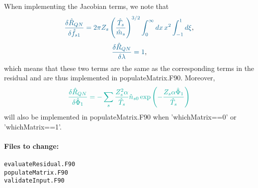 \documentclass[12pt]{article}
\begin{document}
\noindent When implementing the Jacobian terms, we note that 
\begin{equation}
  \label{eq:QNJacobianf1}
\textcolor{MidnightBlue}{
  \frac{\delta \hat{R}_{QN}}{\delta \hat{f}_{s 1}} = 2\pi Z_s \left(\frac{\hat{T}_s}{\hat{m}_s}\right)^{3/2} \int_0^{\infty} dx \, x^2 \int_{-1}^1 d\xi},
\end{equation}
\begin{equation}
  \label{eq:QNJacobianLambda}
\textcolor{MidnightBlue}{
  \frac{\delta \hat{R}_{QN}}{\delta \lambda} = 1},
\end{equation}
which means that these two terms are the same as the corresponding terms in the residual and are thus implemented in populateMatrix.F90.
Moreover,
\begin{equation}
  \label{eq:QNJacobianPhi1}
\textcolor{JungleGreen}{
  \frac{\delta \hat{R}_{QN}}{\delta \hat{\Phi}_1} = -
\sum_s  \frac{Z_s^2 \alpha}{\hat{T}_s} \hat{n}_{s0} \exp \left(- \frac{Z_s \alpha \hat{\Phi}_1}{\hat{T}_s}  \right)}
\end{equation}
will also be implemented in populateMatrix.F90 when 'whichMatrix==0' or 'whichMatrix==1'. 


\paragraph*{\textbf{Files to change:}}
\begin{verbatim}
evaluateResidual.F90
populateMatrix.F90
validateInput.F90
\end{verbatim}
\end{document}
